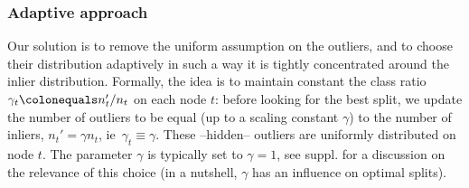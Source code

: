 \subsubsection{Adaptive approach}
Our solution is to remove the uniform assumption on
the outliers, and to choose their distribution adaptively in such a way it is
tightly concentrated around the inlier distribution. Formally, the idea is to
maintain constant the class ratio $\gamma_t \colonequals n_t' / n_t$ on each
node $t$: before looking for the best split, we update the number of outliers
to be equal (up to a scaling constant $\gamma$) to the number of inliers, $n_t'
= \gamma n_t$, \acs{ie}~$\gamma_t \equiv \gamma$. These --hidden-- outliers are
uniformly distributed on node $t$. The parameter $\gamma$ is typically set to
$\gamma = 1$, see suppl.  for a discussion on
the relevance of this choice (in a nutshell, $\gamma$ has an influence on
optimal splits).
%
